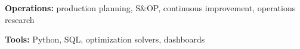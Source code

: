\item \textbf{Operations:} production planning, S\&OP, continuous improvement, operations research
\item \textbf{Tools:} Python, SQL, optimization solvers, dashboards
